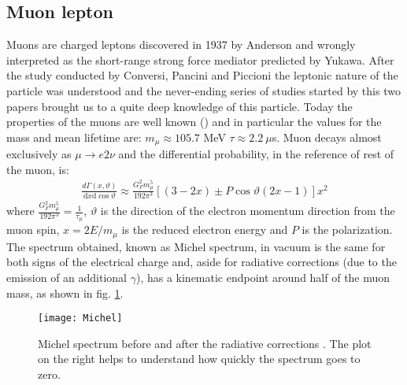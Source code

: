 \documentclass[12pt,a4paper,openright, oneside, titlepage]{book} %
\begin{document}
\subsection{Muon lepton}
\label{muon}
Muons are charged leptons discovered in 1937 by Anderson \cite{Anderson} and wrongly interpreted as the short-range strong force mediator predicted by Yukawa. After the study conducted by Conversi, Pancini and Piccioni \cite{ConvPancPicc} the leptonic nature of the particle was understood and the never-ending series of studies started by this two papers brought us to a quite deep knowledge of this particle. Today the properties of the muons are well known (\cite{PDG}) and in particular the values for the mass and  mean lifetime are: $m_\mu \approx 105.7$ MeV  $\tau\approx 2.2\ \mu$s.
Muon decays almost exclusively as $\mu\rightarrow e2\nu$ and the differential probability, in the reference of rest of the muon, is:
\begin{align}
\frac{d\Gamma(x,\vartheta)}{\mathrm dx \mathrm d\cos\vartheta}\approx \frac{G_F^2m_\mu^5}{192\pi^3}[(3-2x)\pm P\cos\vartheta(2x-1)]x^2
\label{eq_muon}
\end{align}
where $\frac{G_F^2m_\mu^5}{192\pi^3}=\frac{1}{\tau_\mu}$, $\vartheta$ is the direction of the electron momentum direction from the muon spin, $x=2E/m_{\mu}$ is the reduced electron energy and $P$ is the polarization.\\
The spectrum obtained, known as Michel spectrum, in vacuum is the same for both signs of the electrical charge and, aside for radiative corrections (due to the emission of an additional $\gamma$), has a kinematic endpoint around half of the muon mass, as shown in fig. \ref{_Michel}.\\

\begin{figure}[h!]
\centering
\texttt{[image: Michel]}
\caption{Michel spectrum before and after the radiative corrections \cite{signorelli}. The plot on the right helps to understand how quickly the spectrum goes to zero.}
\label{_Michel}
\end{figure}
\end{document}
